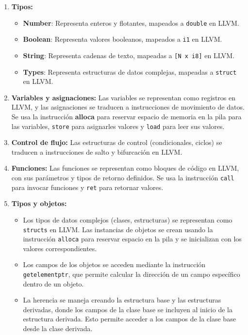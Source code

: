 \documentclass{article}
\begin{document}
\begin{enumerate}
  \item \textbf{Tipos:}
      \begin{itemize}
        \item \textbf{Number}: Representa enteros y flotantes, mapeados a \texttt{double} en LLVM.
        \item \textbf{Boolean}: Representa valores booleanos, mapeados a \texttt{i1} en LLVM.
        \item \textbf{String}: Representa cadenas de texto, mapeadas a \texttt{[N x i8]} en LLVM.
        \item \textbf{Types}: Representa estructuras de datos complejas, mapeadas a \texttt{struct} en LLVM.
      \end{itemize}
  \item \textbf{Variables y asignaciones:} Las variables se representan como registros en LLVM, y las asignaciones se traducen a instrucciones de movimiento de datos. Se usa la instrucción \textbf{alloca} para reservar espacio de memoria en la pila para las variables, \texttt{store} para asignarles valores  y \texttt{load} para leer sus valores.
  \item \textbf{Control de flujo:} Las estructuras de control (condicionales, ciclos) se traducen a instrucciones de salto y bifurcación en LLVM.
  \item \textbf{Funciones:} Las funciones se representan como bloques de código en LLVM, con sus parámetros y tipos de retorno definidos. Se usa la instrucción \texttt{call} para invocar funciones y \texttt{ret} para retornar valores.
  \item \textbf{Tipos y objetos:} 
      \begin{itemize}
        \item Los tipos de datos complejos (clases, estructuras) se representan como \texttt{structs} en LLVM. Las instancias de objetos se crean usando la instrucción \texttt{alloca} para reservar espacio en la pila y se inicializan con los valores correspondientes.
        \item Los campos de los objetos se acceden mediante la instrucción \texttt{getelementptr}, que permite calcular la dirección de un campo específico dentro de un objeto.
        \item La herencia se maneja creando la estructura base y las estructuras derivadas, donde los campos de la clase base se incluyen al inicio de la estructura derivada. Esto permite acceder a los campos de la clase base desde la clase derivada.

\end{itemize}
\end{enumerate}
\end{document}
